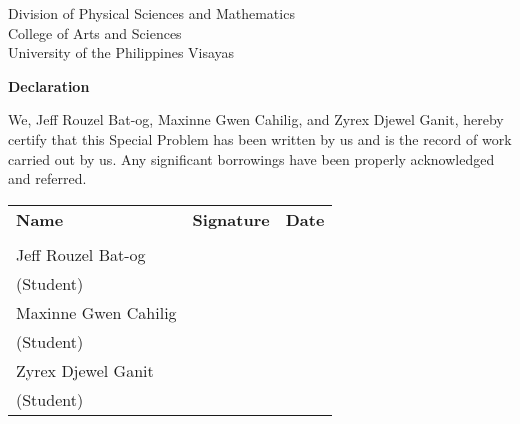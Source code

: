 \begin{center}
	Division of Physical Sciences and Mathematics\\
	College of Arts and Sciences\\
	University of the Philippines Visayas 
	
		\textbf{Declaration}
		\end{center}

We,  Jeff Rouzel Bat-og, Maxinne Gwen Cahilig, and Zyrex Djewel Ganit, hereby certify that this Special Problem has been written by us  and is the record of work carried out by us. Any significant borrowings have been properly acknowledged and referred.

	\begin{tabular}{lll}
	\bfseries Name  & \bfseries Signature & \bfseries Date\\ \\
	Jeff Rouzel Bat-og &\signaturerule  & \signaturerule\\ 
	\multicolumn{1}{l}{(Student)} \\ 
	Maxinne Gwen Cahilig &\signaturerule  & \signaturerule\\ 
	\multicolumn{1}{l}{(Student)} \\
	Zyrex Djewel Ganit &\signaturerule  & \signaturerule\\ 
\multicolumn{1}{l}{(Student)} \\

\end{tabular}




